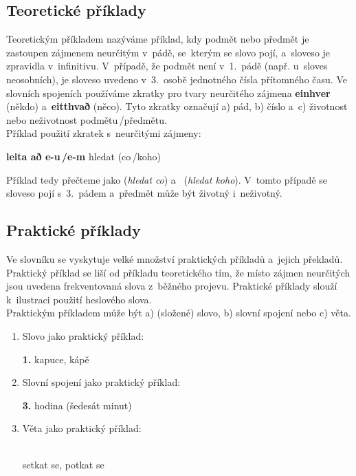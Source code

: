 \subsection*{Teoretické příklady}

Teoretickým příkladem nazýváme příklad, kdy podmět nebo předmět je zastoupen zájmenem neurčitým v~pádě, se~kterým se slovo pojí, a~sloveso je zpravidla v~infinitivu. V~případě, že podmět není v~1.~pádě (např. u~sloves neosobních), je sloveso uvedeno v~3.~osobě jednotného čísla přítomného času.
Ve slovních spojeních používáme zkratky pro tvary neurčitého zájmena \textbf{einhver} (někdo) a~\textbf{eitthvað} (něco). Tyto zkratky označují a) pád, b) číslo a~c) životnost nebo neživotnost podmětu\,/\addthin předmětu.\\
Příklad použití zkratek s~neurčitými zájmeny:

\blspace
  \dicEntry {}   \textbf{leita að e-u\,/\addthin e-m} {hledat (co\,/\addthin koho)}  
\blspace

Příklad tedy přečteme jako  (\textit{hledat co}) a~ (\textit{hledat koho}). V~tomto případě se sloveso pojí s~3.~pádem a~předmět může být životný i~neživotný.

\subsection*{Praktické příklady}

Ve slovníku se vyskytuje velké množství praktických příkladů a~jejich překladů. Praktický příklad se liší od příkladu teoretického tím, že místo zájmen neurčitých jsou uvedena frekventovaná slova z~běžného projevu. Praktické příklady slouží k~ilustraci použití
heslového slova.\\
Praktickým příkladem může být a) (složené) slovo, b) slovní spojení nebo c) věta.

\begin{enumerate}
\item Slovo jako praktický příklad:

\blspace
\dicEntry {}   \textbf{1.} {kapuce, kápě}  
\blspace

\item Slovní spojení jako praktický příklad:

\blspace
\dicEntry {}   \textbf{3.}  {hodina} {\footnotesize{(šedesát minut)}}  
\blspace

\item Věta jako praktický příklad:

\blspace
\dicEntry {}   \\
    {setkat se, potkat se}  
\end{enumerate}

